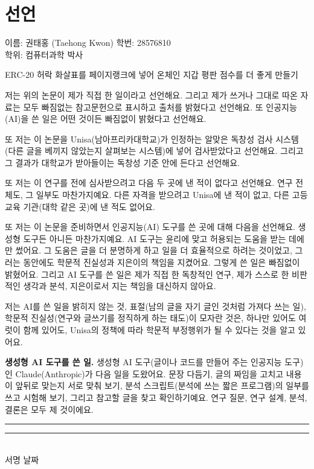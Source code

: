 
\clearpage
{}
\chapter*{선언}
\label{ch:declaration}

\begingroup{}
\noindent 이름: 권태홍 (Taehong Kwon) \hfill 학번: 28576810\\
학위: 컴퓨터과학 박사

\smallskip
\noindent ERC-20 허락 화살표를 페이지랭크에 넣어 온체인 지갑 평판 점수를 더 좋게 만들기

\smallskip
저는 위의 논문이 제가 직접 한 일이라고 선언해요. 그리고 제가 쓰거나 그대로 따온 자료는 모두 빠짐없는 참고문헌으로 표시하고 출처를 밝혔다고 선언해요. 또 인공지능(AI)을 쓴 일은 어떤 것이든 빠짐없이 밝혔다고 선언해요.

또 저는 이 논문을 Unisa(남아프리카대학교)가 인정하는 알맞은 독창성 검사 시스템(다른 글을 베끼지 않았는지 살펴보는 시스템)에 넣어 검사받았다고 선언해요. 그리고 그 결과가 대학교가 받아들이는 독창성 기준 안에 든다고 선언해요.

또 저는 이 연구를 전에 심사받으려고 다음 두 곳에 낸 적이 없다고 선언해요. 연구 전체도, 그 일부도 마찬가지예요. 다른 자격을 받으려고 Unisa에 낸 적이 없고, 다른 고등 교육 기관(대학 같은 곳)에 낸 적도 없어요.

또 저는 이 논문을 준비하면서 인공지능(AI) 도구를 쓴 곳에 대해 다음을 선언해요. 생성형 도구든 아니든 마찬가지예요. AI 도구는 윤리에 맞고 허용되는 도움을 받는 데에만 썼어요. 그 도움은 글을 더 분명하게 하고 일을 더 효율적으로 하려는 것이었고, 그러는 동안에도 학문적 진실성과 지은이의 책임을 지켰어요. 그렇게 쓴 일은 빠짐없이 밝혔어요. 그리고 AI 도구를 쓴 일은 제가 직접 한 독창적인 연구, 제가 스스로 한 비판적인 생각과 분석, 지은이로서 지는 책임을 대신하지 않아요.

저는 AI를 쓴 일을 밝히지 않는 것, 표절(남의 글을 자기 글인 것처럼 가져다 쓰는 일), 학문적 진실성(연구와 글쓰기를 정직하게 하는 태도)이 모자란 것은, 하나만 있어도 여럿이 함께 있어도, Unisa의 정책에 따라 학문적 부정행위가 될 수 있다는 것을 알고 있어요.

\smallskip
\noindent\textbf{생성형 AI 도구를 쓴 일.} 생성형 AI 도구(글이나 코드를 만들어 주는 인공지능 도구)인 Claude(Anthropic)가 다음 일을 도왔어요. 문장 다듬기, 글의 짜임을 고치고 내용이 앞뒤로 맞는지 서로 맞춰 보기, 분석 스크립트(분석에 쓰는 짧은 프로그램)의 일부를 쓰고 시험해 보기, 그리고 참고할 글을 찾고 확인하기예요. 연구 질문, 연구 설계, 분석, 결론은 모두 제 것이에요.

\vspace{1.8em}
\noindent\rule{6cm}{0.4pt}\hfill\rule{4cm}{0.4pt}\\
서명 \hfill 날짜
\par\endgroup
